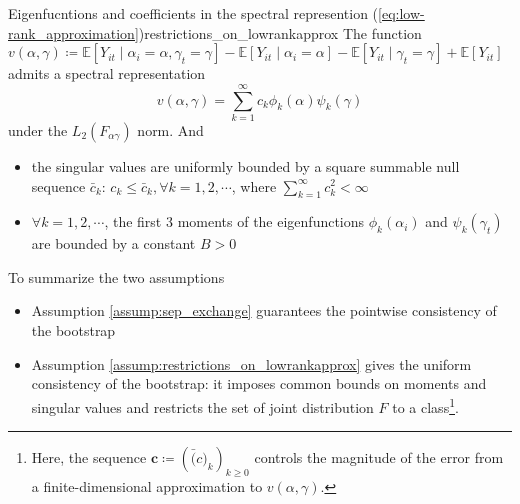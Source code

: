 \documentclass[twoside]{article}
\begin{document}
\begin{assumption}{Eigenfucntions and coefficients in the spectral represention (\ref{eq:low-rank_approximation})}{restrictions_on_lowrankapprox}
    The function $v(\alpha,\gamma)\coloneq \mathbb{E}\left[Y_{it}\mid \alpha_i=\alpha,\gamma_t=\gamma\right] - \mathbb{E}\left[Y_{it}\mid \alpha_i=\alpha\right] - \mathbb{E}\left[Y_{it}\mid \gamma_t=\gamma\right] + \mathbb{E}\left[Y_{it}\right]$ admits a spectral representation
    $$
    v(\alpha,\gamma) = \sum^{\infty}_{k=1}c_k\phi_k(\alpha)\psi_k(\gamma)
    $$
    under the $L_2(F_{\alpha\gamma})$ norm. And 
    \begin{itemize}
        \item the singular values are uniformly bounded by a square summable null sequence $\bar{c}_k$: $c_k\leq \bar{c}_k,\forall k=1,2,\cdots$, where $\sum^{\infty}_{k=1}c^2_k< \infty$
        \item $\forall k=1,2,\cdots$, the first 3 moments of the eigenfunctions $\phi_k(\alpha_i)$ and $\psi_k(\gamma_t)$ are bounded by a constant $B>0$
    \end{itemize}
\end{assumption}
To summarize the two assumptions
\begin{itemize}
    \item Assumption \ref{assump:sep_exchange} guarantees the pointwise consistency of the bootstrap
    \item Assumption \ref{assump:restrictions_on_lowrankapprox} gives the uniform consistency of the bootstrap: it imposes common bounds on moments and singular values and restricts the set of joint distribution $F$ to a  class\footnote{Here, the sequence $\mathbf{c}\coloneq \left(\bar(c)_k\right)_{k\geq 0}$ controls the magnitude of the error from a finite-dimensional approximation to $v(\alpha,\gamma)$.}.
\end{itemize}
\end{document}
